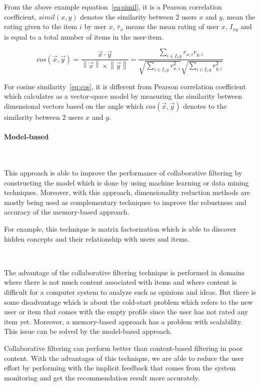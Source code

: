 \documentclass[12pt,oneside,openright,a4paper]{cpe-english-project}
\begin{document}
From the above example equation~\ref{eq:simil}, it is a Pearson correlation coefficient, $simil(x, y)$ denotes the similarity between 2 users $x$ and $y$, mean the rating given to the item $i$ by user $x$, $\bar{r}_{x}$ means the mean rating of user $x$, $I_{xy}$ and is equal to a total number of items in the user-item.


\begin{equation}\label{eq:cos}
cos(\vec{x},\vec{y}) 
=\frac{\vec{x}\cdot \vec{y}}{\left \| \vec{x} \right \|\times \left \| \vec{y} \right \|}
=\frac{\sum_{i\in I_xy}^{}r_{x,i}r_{y,i}}
{\sqrt{\sum_{i\in I_xy}^{}r_{x,i}^2}\sqrt{\sum_{i\in I_xy}^{}r_{y,i}^2}}
\end{equation}

For cosine similarity~\ref{eq:cos}, it is different from Pearson correlation coefficient which calculates as a vector-space model by measuring the similarity between dimensional vectors based on the angle which $cos(\vec{x},\vec{y})$ denotes to the similarity between 2 users $x$ and $y$.


\paragraph{Model-based}\

This approach is able to improve the performance of collaborative filtering by constructing the model which is done by using machine learning or data mining techniques. Moreover, with this approach, dimensionality reduction methods are mostly being used as complementary techniques to improve the robustness and accuracy of the memory-based approach. \cite{Recommendersystem}

For example, this technique is matrix factorization which is able to discover hidden concepts and their relationship with users and items.

\

The advantage of the collaborative filtering technique is performed in domains where there is not much content associated with items and where content is difficult for a computer system to analyze such as opinions and ideas. \cite{Recommendersystem} But there is some disadvantage which is about the cold-start problem which refers to the new user or item that comes with the empty profile since the user has not rated any item yet. Moreover, a memory-based approach has a problem with scalability. This issue can be solved by the model-based approach.

Collaborative filtering can perform better than content-based filtering in poor content. With the advantages of this technique, we are able to reduce the user effort by performing with the implicit feedback that comes from the system monitoring and get the recommendation result more accurately.
\end{document}
